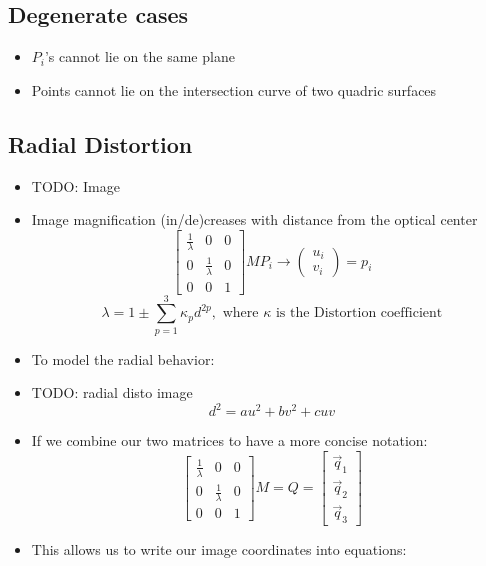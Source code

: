 \subsection{Degenerate cases}
\begin{itemize}
	\item $P_i$'s cannot lie on the same plane
	\item Points cannot lie on the intersection curve of two quadric surfaces
\end{itemize}

\subsection{Radial Distortion}
\begin{itemize}
	\subsubsection{Radial Distortion}
	\item TODO: Image
	\item Image magnification (in/de)creases with distance from the optical center
	$$\begin{bmatrix}
		\frac{1}{\lambda} & 0 & 0 \\
		0 & \frac{1}{\lambda} & 0 \\
		0 & 0 & 1
	\end{bmatrix}MP_i\to \begin{pmatrix}
		u_i \\ v_i
	\end{pmatrix}=p_i$$
	$$\lambda=1\pm\sum_{p=1}^3 \kappa_p d^{2p},\text{ where } \kappa\text{ is the Distortion coefficient}$$
	\item To model the radial behavior:
	\item TODO: radial disto image
	$$d^2=au^2+bv^2+cuv$$
	\item If we combine our two matrices to have a more concise notation:
	$$\begin{bmatrix}
		\frac{1}{\lambda} & 0 & 0 \\
		0 & \frac{1}{\lambda} & 0 \\
		0 & 0 & 1
	\end{bmatrix}M=Q=\begin{bmatrix}
		\vec{q}_1\\
		\vec{q}_2\\
		\vec{q}_3
	\end{bmatrix}$$
	\item This allows us to write our image coordinates into equations:

\end{itemize}

